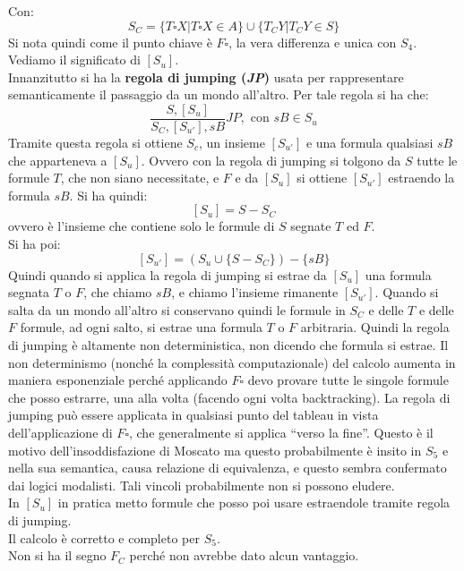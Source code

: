 \documentclass[a4paper,12pt, oneside]{book}
\begin{document}
Con:
\[S_C=\{T\square X|T\square X\in A\}\cup\{T_CY|T_CY\in S\}\]
Si nota quindi come il punto chiave è $F\square$, la vera differenza e unica con
$S_4$. Vediamo il significato di $[S_u]$.\\
Innanzitutto si ha la \textbf{regola di jumping (\textit{JP})} usata per
rappresentare semanticamente il passaggio da un mondo all'altro. Per tale regola
si ha che:
\[\frac{S,[S_u]}{S_C,[S_{u'}],sB}JP,\mbox{ con }sB\in S_u\]
Tramite questa regola si ottiene $S_c$, un insieme $[S_{u'}]$ e una formula
qualsiasi $sB$ che apparteneva a $[S_u]$. Ovvero con la regola di jumping si
tolgono da $S$ tutte le formule $T$, che non siano necessitate, e $F$ e da
$[S_u]$ si ottiene $[S_{u'}]$ estraendo la formula $sB$. Si ha quindi:
\[[S_u]=S-S_C\]
ovvero è l'insieme che contiene solo le formule di $S$ segnate $T$ ed $F$.\\
Si ha poi:
\[[S_{u'}]=(S_u\cup\{S-S_C\})-\{sB\}\]
Quindi quando si applica la regola di jumping si estrae da $[S_u]$ una formula
segnata $T$ o $F$, che chiamo $sB$, e chiamo l'insieme rimanente
$[S_{u'}]$. Quando si salta da un mondo all'altro si conservano quindi le
formule in $S_C$ e delle $T$ e delle $F$ formule, ad ogni salto, si estrae una
formula $T$ o $F$ arbitraria. Quindi la regola di jumping è altamente non
deterministica, non dicendo che formula si estrae. Il non determinismo (nonché
la complessità computazionale) del calcolo aumenta in maniera esponenziale
perché applicando $F\square$ devo provare tutte le singole formule che posso
estrarre, una alla volta (facendo ogni volta backtracking). La regola di jumping
può essere applicata in qualsiasi punto del tableau in vista dell'applicazione
di $F\square$, che generalmente si applica ``verso la fine''. Questo è il motivo
dell'insoddisfazione di Moscato ma questo probabilmente è insito in $S_5$ e
nella sua semantica, causa relazione di equivalenza, e questo sembra confermato
dai logici modalisti. Tali vincoli probabilmente non si possono eludere. \\
In $[S_u]$ in pratica metto formule che posso poi usare estraendole tramite
regola di jumping.\\
Il calcolo è corretto e completo per $S_5$.\\
Non si ha il segno $F_C$ perché non avrebbe dato alcun vantaggio.
\end{document}
